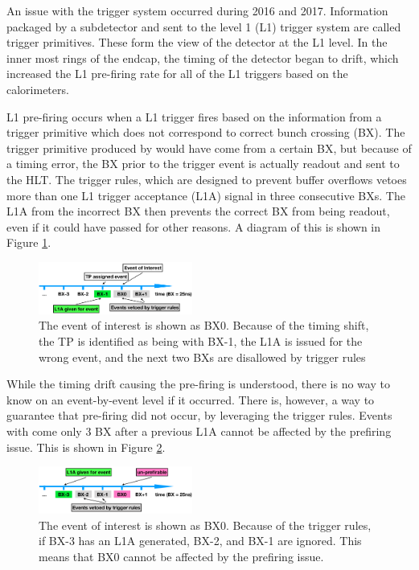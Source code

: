 An issue with the \ECAL trigger system occurred during 2016 and 2017.  Information packaged by a subdetector and sent to the level 1 (L1) trigger system are called trigger primitives.  These form the view of the \CMS detector at the L1 level.  In the inner most rings of the \ECAL endcap, the timing of the detector began to drift, which increased the L1 pre-firing rate for all of the L1 triggers based on the calorimeters.

L1 pre-firing occurs when a L1 trigger fires based on the information from a trigger primitive which does not correspond to correct bunch crossing (BX).  The trigger primitive produced by \ECAL would have come from a certain BX, but because of a timing error, the BX prior to the trigger event is actually readout and sent to the HLT.  The \CMS trigger rules, which are designed to prevent buffer overflows vetoes more than one L1 trigger acceptance (L1A) signal in three consecutive BXs. The L1A from the incorrect BX then prevents the correct BX from being readout, even if it could have passed for other reasons.
A diagram of this is shown in Figure \ref{fig:L1prefire}.
\begin{figure}[htbp]
  \centering
  \includegraphics[width=0.45\textwidth]{figures/prefire.png}
  \caption{The event of interest is shown as BX0.  Because of the timing shift, the TP is identified as being with BX-1, the L1A is issued for the wrong event, and the next two BXs are disallowed by trigger rules}
 
  \label{fig:L1prefire}
\end{figure}
While the timing drift causing the pre-firing is understood, there is no way to know on an event-by-event level if it occurred. There is, however, a way to guarantee that pre-firing did not occur, by leveraging the trigger rules. Events with come only 3 BX after a previous L1A cannot be affected by the prefiring issue. This is shown in Figure \ref{fig:L1unprefireable}.
\begin{figure}[htbp]
  \centering
  \includegraphics[width=0.45\textwidth]{figures/unprefirable.png}
  \caption{The event of interest is shown as BX0.  Because of the trigger rules, if BX-3 has an L1A generated, BX-2, and BX-1 are ignored.  This means that BX0 cannot be affected by the prefiring issue.}
 
  \label{fig:L1unprefireable}
\end{figure}


